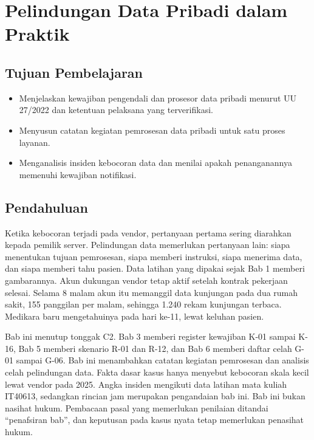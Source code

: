 \chapter{Pelindungan Data Pribadi dalam Praktik}

\section*{Tujuan Pembelajaran}
\begin{itemize}
  \item Menjelaskan kewajiban pengendali dan prosesor data pribadi menurut UU 27/2022 dan ketentuan
  pelaksana yang terverifikasi.
  \item Menyusun catatan kegiatan pemrosesan data pribadi untuk satu proses layanan.
  \item Menganalisis insiden kebocoran data dan menilai apakah penanganannya memenuhi kewajiban
  notifikasi.
\end{itemize}

\section{Pendahuluan}

Ketika kebocoran terjadi pada vendor, pertanyaan pertama sering diarahkan kepada pemilik server.
Pelindungan data memerlukan pertanyaan lain: siapa menentukan tujuan pemrosesan, siapa memberi
instruksi, siapa menerima data, dan siapa memberi tahu pasien. Data latihan yang dipakai sejak Bab 1
memberi gambarannya. Akun dukungan vendor tetap aktif setelah kontrak pekerjaan selesai. Selama 8
malam akun itu memanggil data kunjungan pada dua rumah sakit, 155 panggilan per malam, sehingga
1.240 rekam kunjungan terbaca. Medikara baru mengetahuinya pada hari ke-11, lewat keluhan pasien.

Bab ini menutup tonggak C2. Bab 3 memberi register kewajiban K-01 sampai K-16, Bab 5 memberi
skenario R-01 dan R-12, dan Bab 6 memberi daftar celah G-01 sampai G-06. Bab ini menambahkan catatan
kegiatan pemrosesan dan analisis celah pelindungan data. Fakta dasar kasus hanya menyebut kebocoran
skala kecil lewat vendor pada 2025. Angka insiden mengikuti data latihan mata kuliah IT40613,
sedangkan rincian jam merupakan pengandaian bab ini. Bab ini bukan nasihat hukum. Pembacaan pasal
yang memerlukan penilaian ditandai ``penafsiran bab'', dan keputusan pada kasus nyata tetap
memerlukan penasihat hukum.

